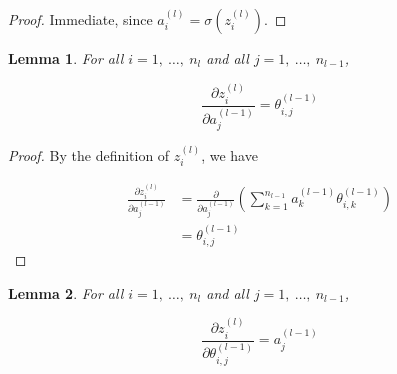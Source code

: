 \documentclass{article}[11pt]
\newtheorem{lemma}{Lemma}
\begin{document}
        \begin{proof}
        
            Immediate, since $a^{(l)}_i = \sigma(z^{(l)}_i)$.
        
        \end{proof}
    
        
        
        \begin{lemma}
            
            For all $i = 1, \ \ldots, \ n_l$ and all $j = 1, \ \ldots, \ n_{l-1}$,
            
            $$
            \frac{\partial z^{(l)}_i}{\partial a^{(l-1)}_j} = \theta^{(l-1)}_{i,j}
            $$
            
        \end{lemma}
        
        \begin{proof}
            
            By the definition of $z^{(l)}_i$, we have
            
            $$ \begin{aligned}
            \frac{\partial z^{(l)}_i}{\partial a^{(l-1)}_j}
            &= \frac{\partial}{\partial a^{(l-1)}_j} \left( \sum_{k = 1}^{n_{l-1}} a^{(l-1)}_k \theta^{(l-1)}_{i,k} \right) \\
            &= \theta^{(l-1)}_{i,j}
            \end{aligned} $$
            
        \end{proof}
        
        
        
        
        \begin{lemma}
            
            For all $i = 1, \ \ldots, \ n_l$ and all $j = 1, \ \ldots, \ n_{l-1}$,
            
            $$
            \frac{\partial z^{(l)}_i}{\partial \theta^{(l-1)}_{i,j}} = a^{(l-1)}_j
            $$
        
        \end{lemma}
        
\end{document}
